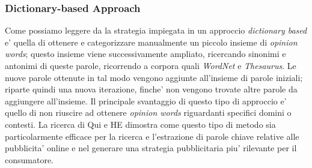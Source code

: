 \documentclass[a4paper,12pt,openright,twoside]{report}
\theoremstyle{definition}
\begin{document}
\subsubsection{Dictionary-based Approach}
Come possiamo leggere da %
la strategia impiegata in un approccio \emph{dictionary based} e' quella di ottenere e categorizzare
manualmente un piccolo insieme di \emph{opinion words}; questo insieme
viene successivamente ampliato, ricercando sinonimi e antonimi di queste parole,
ricorrendo a corpora quali \emph{WordNet}
e \emph{Thesaurus}.
Le nuove parole ottenute in tal modo vengono aggiunte all'insieme di parole iniziali;
riparte quindi una nuova iterazione, finche' non 
vengono trovate altre parole da aggiungere all'insieme.
Il principale svantaggio di questo tipo di approccio e' quello di non riuscire ad ottenere \emph{opinion words}
riguardanti specifici domini o contesti.
La ricerca di Qui e HE %
dimostra come questo tipo di metodo sia particolarmente efficace per la ricerca e l'estrazione di parole
chiave relative alle pubblicita' online e nel generare una strategia pubblicitaria piu' rilevante per il
consumatore.
\end{document}
